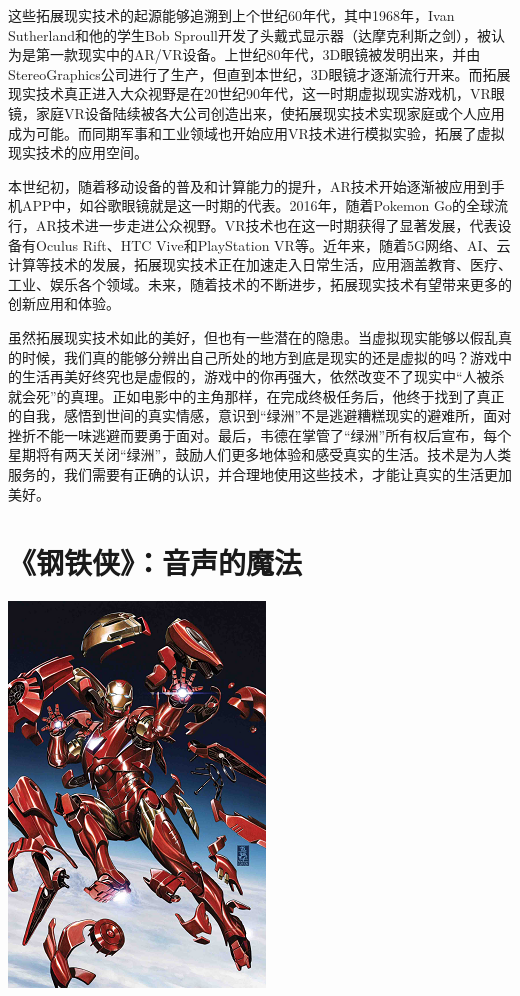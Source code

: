 这些拓展现实技术的起源能够追溯到上个世纪60年代，其中1968年，Ivan Sutherland和他的学生Bob Sproull开发了头戴式显示器（达摩克利斯之剑），被认为是第一款现实中的AR/VR设备。上世纪80年代，3D眼镜被发明出来，并由StereoGraphics公司进行了生产，但直到本世纪，3D眼镜才逐渐流行开来。而拓展现实技术真正进入大众视野是在20世纪90年代，这一时期虚拟现实游戏机，VR眼镜，家庭VR设备陆续被各大公司创造出来，使拓展现实技术实现家庭或个人应用成为可能。而同期军事和工业领域也开始应用VR技术进行模拟实验，拓展了虚拟现实技术的应用空间。

本世纪初，随着移动设备的普及和计算能力的提升，AR技术开始逐渐被应用到手机APP中，如谷歌眼镜就是这一时期的代表。2016年，随着Pokemon Go的全球流行，AR技术进一步走进公众视野。VR技术也在这一时期获得了显著发展，代表设备有Oculus Rift、HTC Vive和PlayStation VR等。近年来，随着5G网络、AI、云计算等技术的发展，拓展现实技术正在加速走入日常生活，应用涵盖教育、医疗、工业、娱乐各个领域。未来，随着技术的不断进步，拓展现实技术有望带来更多的创新应用和体验。

虽然拓展现实技术如此的美好，但也有一些潜在的隐患。当虚拟现实能够以假乱真的时候，我们真的能够分辨出自己所处的地方到底是现实的还是虚拟的吗？游戏中的生活再美好终究也是虚假的，游戏中的你再强大，依然改变不了现实中“人被杀就会死”的真理。正如电影中的主角那样，在完成终极任务后，他终于找到了真正的自我，感悟到世间的真实情感，意识到“绿洲”不是逃避糟糕现实的避难所，面对挫折不能一味逃避而要勇于面对。最后，韦德在掌管了“绿洲”所有权后宣布，每个星期将有两天关闭“绿洲”，鼓励人们更多地体验和感受真实的生活。技术是为人类服务的，我们需要有正确的认识，并合理地使用这些技术，才能让真实的生活更加美好。

\section{《钢铁侠》：音声的魔法}

\begin{marginfigure}
    \includegraphics{images/tech_10.png}
\end{marginfigure}


